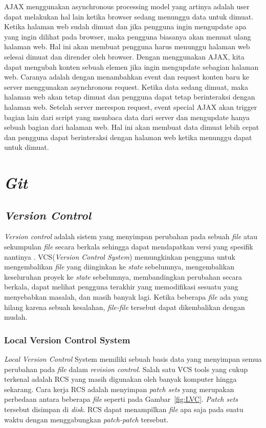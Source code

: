 AJAX menggunakan asynchronous processing model yang artinya adalah user dapat melakukan hal lain ketika browser sedang menunggu data untuk dimuat. Ketika halaman web sudah dimuat dan jika pengguna ingin mengupdate apa yang ingin dilihat pada browser, maka pengguna biasanya akan memuat ulang halaman web. Hal ini akan membuat pengguna harus menunggu halaman web selesai dimuat dan dirender oleh browser. Dengan menggunakan AJAX, kita dapat mengubah konten sebuah elemen jika ingin mengupdate sebagian halaman web. Caranya adalah dengan menambahkan event dan request konten baru ke server menggunakan asynchronous request. Ketika data sedang dimuat, maka halaman web akan tetap dimuat dan pengguna dapat tetap berinteraksi dengan halaman web. Setelah server merespon request, event special AJAX akan trigger bagian lain dari script yang membaca data dari server dan mengupdate hanya sebuah bagian dari halaman web. Hal ini akan membuat data dimuat lebih cepat dan pengguna dapat berinteraksi dengan halaman web ketika menunggu dapat untuk dimuat.

\section{\textit{Git}}
\label{sec:Git}

\subsection{\textit{Version Control}}
\textit{Version control} adalah sistem yang menyimpan perubahan pada sebuah \textit{file} atau sekumpulan \textit{file} secara berkala sehingga dapat mendapatkan versi yang spesifik nantinya \cite{chacon2014pro}. VCS(\textit{Version Control System}) memungkinkan pengguna untuk mengembalikan \textit{file} yang diinginkan ke \textit{state} sebelumnya, mengembalikan keseluruhan proyek ke \textit{state} sebelumnya, membandingkan perubahan secara berkala, dapat melihat pengguna terakhir yang memodifikasi sesuatu yang menyebabkan masalah, dan masih banyak lagi. Ketika beberapa \textit{file} ada yang hilang karena sebuah kesalahan, \textit{file-file} tersebut dapat dikembalikan dengan mudah. 

\subsubsection{Local Version Control System}
\textit{Local Version Control} System memiliki sebuah basis data yang menyimpan semua perubahan pada \textit{file} dalam \textit{revision control}. Salah satu VCS tools yang cukup terkenal adalah RCS yang masih digunakan oleh banyak komputer hingga sekarang. Cara kerja RCS adalah menyimpan \textit{patch sets} yang merupakan perbedaan antara beberapa \textit{file} seperti pada Gambar~\ref{fig:LVC}. \textit{Patch sets} tersebut disimpan di \textit{disk}. RCS dapat menampilkan \textit{file} apa saja pada suatu waktu dengan menggabungkan \textit{patch-patch} tersebut.  

